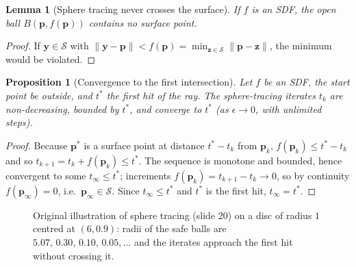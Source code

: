 \documentclass[11pt,a4paper]{article}
\newcommand{\bp}{{\bm{p}}}
\newcommand{\n}{{\bm{n}}}
\theoremstyle{definition}
\theoremstyle{plain}
\newtheorem{lemma}[definition]{Lemma}
\newtheorem{proposition}[definition]{Proposition}
\theoremstyle{remark}
\begin{document}
\begin{lemma}[Sphere tracing never crosses the surface]\label{lem:safe}
If $f$ is an SDF, the open ball $B(\bp,f(\bp))$ contains no surface point.
\end{lemma}
\begin{proof}
If $\bm y\in\mathcal S$ with $\|\bm y-\bp\|<f(\bp)=\min_{\bm z\in\mathcal S}\|\bp-\bm z\|$, the minimum would be violated.
\end{proof}

\begin{proposition}[Convergence to the first intersection]\label{prop:stconv}
Let $f$ be an SDF, the start point be outside, and $t^*$ the first hit of the ray. The sphere-tracing iterates $t_k$
are non-decreasing, bounded by $t^*$, and converge to $t^*$ (as $\epsilon\to 0$, with unlimited steps).
\end{proposition}
\begin{proof}
Because $\bp^*$ is a surface point at distance $t^*-t_k$ from $\bp_k$, $f(\bp_k)\le t^*-t_k$ and so
$t_{k+1}=t_k+f(\bp_k)\le t^*$. The sequence is monotone and bounded, hence convergent to some $t_\infty\le t^*$;
increments $f(\bp_k)=t_{k+1}-t_k\to 0$, so by continuity $f(\bp_\infty)=0$, i.e.\ $\bp_\infty\in\mathcal S$.
Since $t_\infty\le t^*$ and $t^*$ is the first hit, $t_\infty=t^*$.
\end{proof}

\begin{figure}[htbp]
\centering
{}
\caption{Original illustration of sphere tracing (slide 20) on a disc of radius $1$ centred at $(6,0.9)$: radii of the
safe balls are $5.07,\,0.30,\,0.10,\,0.05,\dots$ and the iterates approach the first hit without crossing it.}
\end{figure}
\end{document}
